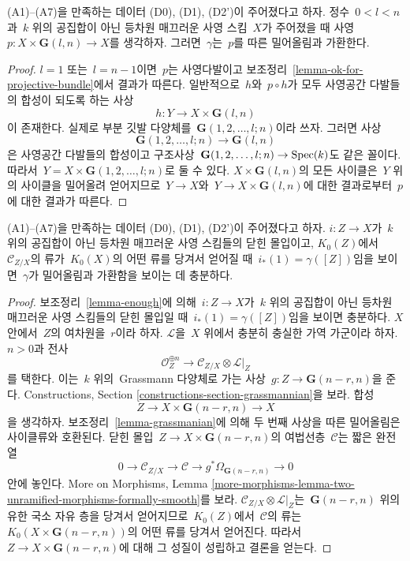 \begin{lemma}
\label{lemma-grassmanian}
(A1)--(A7)을 만족하는 데이터 (D0), (D1), (D2')이 주어졌다고 하자.
정수\  $0 < l < n$과\  $k$ 위의 공집합이 아닌 등차원 매끄러운 사영
스킴\  $X$가 주어졌을 때 사영\ 
$p : X \times \mathbf{G}(l, n) \to X$를 생각하자. 그러면\ 
$\gamma$는\  $p$를 따른 밀어올림과 가환한다.
\end{lemma}

\begin{proof}
$l = 1$ 또는\  $l = n - 1$이면\  $p$는 사영다발이고 보조정리\ 
\ref{lemma-ok-for-projective-bundle}에서 결과가 따른다. 일반적으로\ 
$h$와\  $p \circ h$가 모두 사영공간 다발들의 합성이 되도록 하는 사상
$$
h : Y \to X \times \mathbf{G}(l, n)
$$
이 존재한다. 실제로 부분 깃발 다양체를\ 
$\mathbf{G}(1, 2, \ldots, l; n)$이라 쓰자. 그러면 사상
$$
\mathbf{G}(1, 2, \ldots, l; n) \to \mathbf{G}(l, n)
$$
은 사영공간 다발들의 합성이고 구조사상\ 
$\mathbf{G}(1, 2, \ldots, l; n) \to \mathop{\mathrm{Spec}}(k)$도 같은 꼴이다.
따라서\  $Y = X \times \mathbf{G}(1, 2, \ldots, l; n)$로 둘 수 있다.
$X \times \mathbf{G}(l, n)$의 모든 사이클은\  $Y$ 위의 사이클을
밀어올려 얻어지므로\  $Y \to X$와\ 
$Y \to X \times \mathbf{G}(l, n)$에 대한 결과로부터\  $p$에 대한
결과가 따른다.
\end{proof}

\begin{lemma}
\label{lemma-enough-better}
(A1)--(A7)을 만족하는 데이터 (D0), (D1), (D2')이 주어졌다고 하자.
$i : Z \to X$가\  $k$ 위의 공집합이 아닌 등차원 매끄러운 사영
스킴들의 닫힌 몰입이고, $K_0(Z)$에서\  $\mathcal{C}_{Z/X}$의 류가\ 
$K_0(X)$의 어떤 류를 당겨서 얻어질 때\ 
$i_*(1) = \gamma([Z])$임을 보이면\  $\gamma$가 밀어올림과 가환함을
보이는 데 충분하다.
\end{lemma}

\begin{proof}
보조정리\  \ref{lemma-enough}에 의해\  $i : Z \to X$가\  $k$ 위의 공집합이
아닌 등차원 매끄러운 사영 스킴들의 닫힌 몰입일 때\ 
$i_*(1) = \gamma([Z])$임을 보이면 충분하다. $X$ 안에서\  $Z$의
여차원을\  $r$이라 하자. $\mathcal{L}$을\  $X$ 위에서 충분히 충실한
가역 가군이라 하자. $n > 0$과 전사
$$
\mathcal{O}_Z^{\oplus n} \to \mathcal{C}_{Z/X} \otimes \mathcal{L}|_Z
$$
를 택한다. 이는\  $k$ 위의\  Grassmann 다양체로 가는 사상\ 
$g : Z \to \mathbf{G}(n - r, n)$을 준다. Constructions, Section
\ref{constructions-section-grassmannian}을 보라. 합성
$$
Z \to X \times \mathbf{G}(n - r, n) \to X
$$
을 생각하자. 보조정리\  \ref{lemma-grassmanian}에 의해 두 번째
사상을 따른 밀어올림은 사이클류와 호환된다. 닫힌 몰입\ 
$Z \to X \times \mathbf{G}(n - r, n)$의 여법선층\  $\mathcal{C}$는
짧은 완전열
$$
0 \to \mathcal{C}_{Z/X} \to \mathcal{C} \to
g^*\Omega_{\mathbf{G}(n - r, n)} \to 0
$$
안에 놓인다. More on Morphisms, Lemma
\ref{more-morphisms-lemma-two-unramified-morphisms-formally-smooth}를
보라. $\mathcal{C}_{Z/X} \otimes \mathcal{L}|_Z$는\ 
$\mathbf{G}(n - r, n)$ 위의 유한 국소 자유 층을 당겨서 얻어지므로\ 
$K_0(Z)$에서\  $\mathcal{C}$의 류는\ 
$K_0(X \times \mathbf{G}(n - r, n))$의 어떤 류를 당겨서 얻어진다.
따라서\  $Z \to X \times \mathbf{G}(n - r, n)$에 대해 그 성질이
성립하고 결론을 얻는다.
\end{proof}

